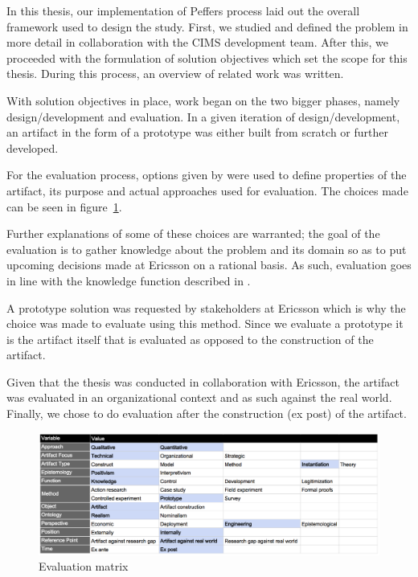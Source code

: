 In this thesis, our implementation of Peffers process laid out the overall framework used to design the study. First, we studied and defined the problem in more detail in collaboration with the CIMS development team. After this, we proceeded with the formulation of solution objectives which set the scope for this thesis. During this process, an overview of related work was written.

With solution objectives in place, work began on the two bigger phases, namely design/development and evaluation. In a given iteration of design/development, an artifact in the form of a prototype was either built from scratch or further developed.

For the evaluation process, options given by \cite{DesignEval} were used to define properties of the artifact, its purpose and actual approaches used for evaluation. The choices made can be seen in figure~\ref{fig:matrix}.

Further explanations of some of these choices are warranted; the goal of the evaluation is to gather knowledge about the problem and its domain so as to put upcoming decisions made at Ericsson on a rational basis. As such, evaluation goes in line with the knowledge function described in \cite{DesignEval}. 

A prototype solution was requested by stakeholders at Ericsson which is why the choice was made to evaluate using this method. Since we evaluate a prototype it is the artifact itself that is evaluated as opposed to the construction of the artifact.

Given that the thesis was conducted in collaboration with Ericsson, the artifact was evaluated in an organizational context and as such against the real world. Finally, we chose to do evaluation after the construction (ex post) of the artifact.

\begin{figure}[h!]
\centering
\includegraphics[width=0.7\pdfpagewidth]{figure/eval.png}
\caption{Evaluation matrix}
\label{fig:matrix}
\end{figure}



